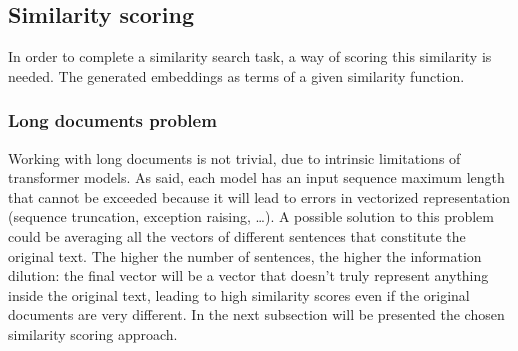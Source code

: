 \documentclass[\main/main.tex]{subfiles}
\begin{document}
\subsection{Similarity scoring}
In order to complete a similarity search task, a way of scoring this similarity is needed. The generated embeddings as terms of a given similarity function. 
\subsubsection{Long documents problem}
Working with long documents is not trivial, due to intrinsic limitations of transformer models. As said, each model has an input sequence maximum length that cannot be exceeded because it will lead to errors in vectorized representation (sequence truncation, exception raising, \dots). A possible solution to this problem could be averaging all the vectors of different sentences that constitute the original text. The higher the number of sentences, the higher the information dilution: the final vector will be a vector that doesn't truly represent anything inside the original text, leading to high similarity scores even if the original documents are very different. In the next subsection will be presented the chosen similarity scoring approach.
\end{document}
